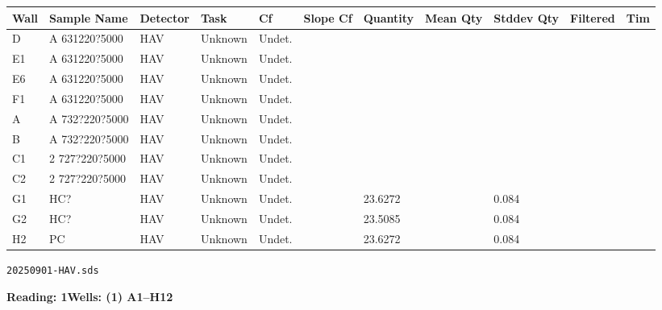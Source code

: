 \documentclass[UTF8,10pt,a4paper,fontset=fandol]{ctexart}
\begin{document}
\small
\begin{center}
\begin{tabular}{|p{0.35in}|p{1.35in}|p{0.45in}|p{0.65in}|p{0.45in}|p{0.55in}|p{0.65in}|p{0.65in}|p{0.65in}|p{0.55in}|p{0.45in}|}
\hline
\textbf{Wall} &
\textbf{Sample Name} &
\textbf{Detector} &
\textbf{Task} &
\textbf{Cf} &
\textbf{Slope Cf} &
\textbf{Quantity} &
\textbf{Mean Qty} &
\textbf{Stddev Qty} &
\textbf{Filtered} &
\textbf{Tim} \\
\hline
D  & A 631220?5000 & HAV & Unknown & Undet. & & & & & & \\
E1 & A 631220?5000 & HAV & Unknown & Undet. & & & & & & \\
E6 & A 631220?5000 & HAV & Unknown & Undet. & & & & & & \\
F1 & A 631220?5000 & HAV & Unknown & Undet. & & & & & & \\
A  & A 732?220?5000 & HAV & Unknown & Undet. & & & & & & \\
B  & A 732?220?5000 & HAV & Unknown & Undet. & & & & & & \\
C1 & 2 727?220?5000 & HAV & Unknown & Undet. & & & & & & \\
C2 & 2 727?220?5000 & HAV & Unknown & Undet. & & & & & & \\
G1 & HC? & HAV & Unknown & Undet. & & 23.6272 & & 0.084 & & \\
G2 & HC? & HAV & Unknown & Undet. & & 23.5085 & & 0.084 & & \\
H2 & PC & HAV & Unknown & Undet. & & 23.6272 & & 0.084 & & \\
\hline
\end{tabular}
\end{center}


\texttt{20250901-HAV.sds}

\newpage

\begin{center}
\textbf{Reading: 1}\qquad \textbf{Wells: (1) A1--H12}
\end{center}
\end{document}
